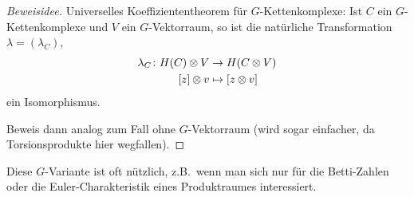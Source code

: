 
\begin{proof}[Beweisidee]
  Universelles Koeffiziententheorem für $G$-Kettenkomplexe:
  Ist $C$ ein $G$-Kettenkomplexe und $V$ ein $G$-Vektorraum, so ist die natürliche Transformation $\lambda = (\lambda_C)$,
  \begin{align*}
    \lambda_C \colon H(C) \otimes V & \to H(C \otimes V)\\
    [z] \otimes v & \mapsto [z \otimes v]
  \end{align*}
  ein Isomorphismus.

  Beweis dann analog zum Fall ohne $G$-Vektorraum (wird sogar einfacher, da Torsionsprodukte hier wegfallen).
\end{proof}

\begin{kommentar}
  Diese $G$-Variante ist oft nützlich, z.B.\ wenn man sich nur für die Betti-Zahlen oder die Euler-Charakteristik eines Produktraumes interessiert.
\end{kommentar}

